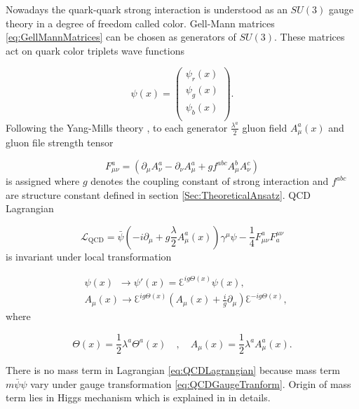 Nowadays the quark-quark strong interaction is understood as an $SU(3)$ gauge theory in
a degree of freedom called color. Gell-Mann matrices \eqref{eq:GellMannMatrices}
can be chosen as generators of $SU(3)$. These matrices act on quark color
triplets wave functions

\begin{equation}
  \psi(x) = \begin{pmatrix}  
    \psi_r(x) \\ \psi_g(x) \\ \psi_b(x) \\ 
            \end{pmatrix}.
  \label{eq:QuarkWaveFunction}
\end{equation}
Following the Yang-Mills theory \cite{YangMill}, to each generator
$\frac{\lambda^a}{2}$ gluon field $A_\mu^a(x)$ and gluon file strength tensor

\begin{equation}
  F_{\mu\nu}^a = \left( \partial_\mu A_\nu^a - \partial_\nu A_\mu^a + g f^{abc}
  A_\mu^b A_\nu^c \right)
  \label{eq:GluonFieldStrengthTensor}
\end{equation}
is assigned where $g$ denotes the coupling constant of strong interaction and
$f^{abc}$ are structure constant defined in section \ref{Sec:TheoreticalAnsatz}.
QCD Lagrangian

\begin{equation}
  \mathscr{L}_{\text{QCD}} = \bar{\psi} \left( -i \partial_\mu + g \frac{\lambda}{2}
  A_\mu^a(x) \right) \gamma^\mu \psi - \frac{1}{4}F_{\mu\nu}^aF_a^{\mu\nu}
  \label{eq:QCDLagrangian}
\end{equation}
is invariant under local transformation

\begin{align}
  &\psi(x) \, \, \, \rightarrow \psi'(x) = \Euler^{ig\Theta(x)} \psi(x),
    \label{eq:QCDGaugeTranform} \\
  &A_\mu(x) \rightarrow \Euler^{ig\Theta(x)} \left( A_\mu(x) +
    \frac{i}{g}\partial_\mu \right) \Euler^{-ig\Theta(x)}, 
  \nonumber
\end{align}
where

\begin{equation}
  \Theta(x) = \frac{1}{2} \lambda^a \Theta^a(x) 
  \quad , \quad
  A_\mu(x) = \frac{1}{2} \lambda^a A_\mu^a(x).
  \label{eq:QCDAdditionalFunctions}
\end{equation}

There is no mass term in Lagrangian \eqref{eq:QCDLagrangian} because mass term
$m\bar{\psi}\psi$ vary under gauge transformation
\eqref{eq:QCDGaugeTranform}. Origin of mass term lies in Higgs mechanism
\cite{HiggsMechanism} which is explained in \cite{horejsi2002fundamentals} in
details.

